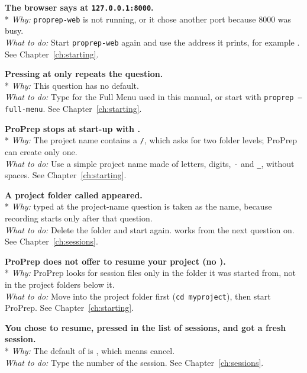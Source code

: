 {\bfseries The browser says  at
\texttt{127.0.0.1:8000}.}\\*
\emph{Why:} \texttt{proprep-web} is not running, or it chose another port
because 8000 was busy.\\
\emph{What to do:} Start \texttt{proprep-web} again and use the address it
prints, for example . See
Chapter~\ref{ch:starting}.

{\bfseries Pressing  at  only repeats
the question.}\\*
\emph{Why:} This question has no default.\\
\emph{What to do:} Type  for the Full Menu used in this manual, or
start with \texttt{proprep --full-menu}. See Chapter~\ref{ch:starting}.

{\bfseries ProPrep stops at start-up with .}\\*
\emph{Why:} The project name contains a \texttt{/}, which asks for two folder
levels; ProPrep can create only one.\\
\emph{What to do:} Use a simple project name made of letters, digits,
\texttt{-} and \texttt{\_}, without spaces. See Chapter~\ref{ch:starting}.

{\bfseries A project folder called  appeared.}\\*
\emph{Why:}  typed at the project-name question is taken as the
name, because recording starts only after that question.\\
\emph{What to do:} Delete the folder and start again.  works from
the next question on. See Chapter~\ref{ch:sessions}.

{\bfseries ProPrep does not offer to resume your project (no
).}\\*
\emph{Why:} ProPrep looks for session files only in the folder it was started
from, not in the project folders below it.\\
\emph{What to do:} Move into the project folder first (\texttt{cd
myproject}), then start ProPrep. See Chapter~\ref{ch:starting}.

{\bfseries You chose to resume, pressed  in the list of sessions,
and got a fresh session.}\\*
\emph{Why:} The default of  is
, which means cancel.\\
\emph{What to do:} Type the number of the session. See
Chapter~\ref{ch:sessions}.

